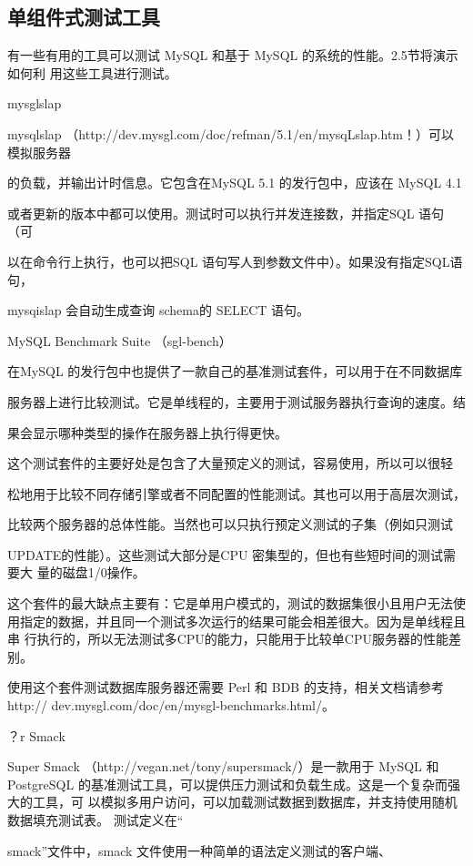 \subsection{单组件式测试工具}
有一些有用的工具可以测试 MySQL 和基于 MySQL 的系统的性能。2.5节将演示如何利
用这些工具进行测试。

mysglslap

mysqlslap （http://dev.mysgl.com/doc/refman/5.1/en/mysqLslap.htm！）可以模拟服务器

的负载，并输出计时信息。它包含在MySQL 5.1 的发行包中，应该在 MySQL 4.1

或者更新的版本中都可以使用。测试时可以执行并发连接数，并指定SQL 语句（可

以在命令行上执行，也可以把SQL 语句写人到参数文件中）。如果没有指定SQL语句，

mysqislap 会自动生成查询 schema的 SELECT 语句。

MySQL Benchmark Suite （sgl-bench）

在MySQL 的发行包中也提供了一款自己的基准测试套件，可以用于在不同数据库

服务器上进行比较测试。它是单线程的，主要用于测试服务器执行查询的速度。结

果会显示哪种类型的操作在服务器上执行得更快。

这个测试套件的主要好处是包含了大量预定义的测试，容易使用，所以可以很轻

松地用于比较不同存储引擎或者不同配置的性能测试。其也可以用于高层次测试，

比较两个服务器的总体性能。当然也可以只执行预定义测试的子集（例如只测试

UPDATE的性能）。这些测试大部分是CPU 密集型的，但也有些短时间的测试需要大
量的磁盘1/0操作。

这个套件的最大缺点主要有：它是单用户模式的，测试的数据集很小且用户无法使
用指定的数据，并且同一个测试多次运行的结果可能会相差很大。因为是单线程且串
行执行的，所以无法测试多CPU的能力，只能用于比较单CPU服务器的性能差别。

使用这个套件测试数据库服务器还需要 Perl 和 BDB 的支持，相关文档请参考 http://
dev.mysgl.com/doc/en/mysgl-benchmarks.html/。

？r Smack

Super Smack （http://vegan.net/tony/supersmack/）是一款用于 MySQL 和 PostgreSQL
的基准测试工具，可以提供压力测试和负载生成。这是一个复杂而强大的工具，可
以模拟多用户访问，可以加载测试数据到数据库，并支持使用随机数据填充测试表。
测试定义在“

smack”文件中，smack 文件使用一种简单的语法定义测试的客户端、

